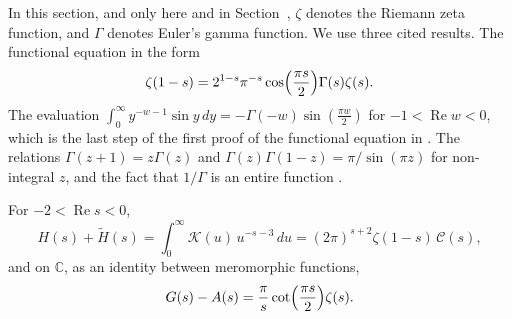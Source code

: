In this section, and only here and in Section~, $\zeta$ denotes the Riemann zeta function, and $\Gamma$ denotes Euler's gamma function. We use three cited results. The functional equation in the form \cite[(2.1.8), p.~16]{Titchmarsh1986}
\begin{equation}\label{eq:zetafe}
\zeta(1-s)=2^{1-s}\pi^{-s}\cos\Bigl(\frac{\pi s}2\Bigr)\Gamma(s)\zeta(s) .
\end{equation}
The evaluation $\int_0^\infty y^{-w-1}\sin y\,dy=-\Gamma(-w)\sin(\frac{\pi w}2)$ for $-1<\operatorname{Re}w<0$, which is the last step of the first proof of the functional equation in \cite[p.~15]{Titchmarsh1986}. The relations $\Gamma(z+1)=z\Gamma(z)$ and $\Gamma(z)\Gamma(1-z)=\pi/\sin(\pi z)$ for non-integral $z$, and the fact that $1/\Gamma$ is an entire function \cite[\S4.41, p.~149]{Titchmarsh1939}.

\begin{proposition}\label{prop:zeta}
For $-2<\operatorname{Re}s<0$,
\begin{equation}\label{eq:HHzeta}
H(s)+\widetilde H(s)=\int_0^\infty\mathcal K(u)\,u^{-s-3}\,du=(2\pi)^{s+2}\zeta(1-s)\,\mathcal C(s),
\end{equation}
and on $\mathbb C$, as an identity between meromorphic functions,
\begin{equation}\label{eq:GAzeta}
G(s)-A(s)=\frac\pi s\cot\Bigl(\frac{\pi s}2\Bigr)\zeta(s) .
\end{equation}
\end{proposition}

